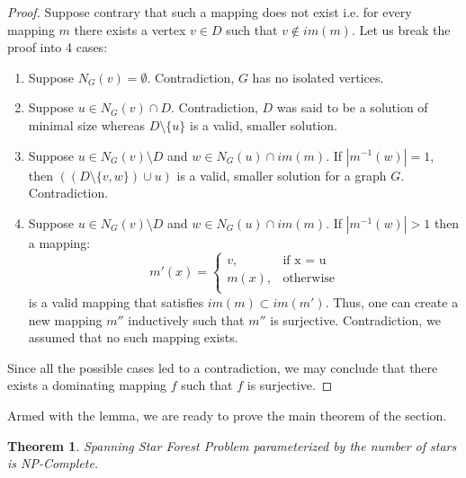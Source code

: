\documentclass[en]{pracamgr}
\newtheorem{theorem}{Theorem}
\newcommand{\kssf}{\emph{Spanning Star Forest Problem} parameterized by the number of stars}
\begin{document}
\begin{proof}
	Suppose contrary that such a mapping does not exist i.e. for every mapping $m$ there exists a vertex $v \in D$ such that $v \notin im(m)$. Let us break the proof into 4 cases:
	\begin{enumerate}
		\item Suppose $N_G(v) = \emptyset$. Contradiction, $G$ has no isolated vertices.
		\item Suppose $u \in N_G(v) \cap D$. Contradiction, $D$ was said to be a solution of minimal size whereas $D \setminus \{u\}$ is a valid, smaller solution.
		\item Suppose $u \in N_{G}(v) \setminus D$ and $w \in N_G(u) \cap im(m)$. If $|m^{-1}(w)|=1$, then $((D \setminus \{v,w\}) \cup u)$ is a valid, smaller solution for a graph $G$. Contradiction.
		\item Suppose $u \in N_{G}(v) \setminus D$ and $w \in N_G(u) \cap im(m)$. If $|m^{-1}(w)| > 1$ then a mapping:
		\begin{equation*}
			m'(x) = \begin{cases}
			v, & \text{if x = u} \\
			m(x), &\text{otherwise} \\
			\end{cases}
		\end{equation*}
		is a valid mapping that satisfies $im(m) \subset im(m')$. Thus, one can create a new mapping $m''$ inductively such that $m''$ is surjective. Contradiction, we assumed that no such mapping exists. 
	\end{enumerate}
	
	Since all the possible cases led to a contradiction, we may conclude that there exists a dominating mapping $f$ such that $f$ is surjective.  
\end{proof}

Armed with the lemma, we are ready to prove the main theorem of the section.

\begin{theorem}\label{dom ssf}
	\kssf{} is NP-Complete.
\end{theorem}
\end{document}

